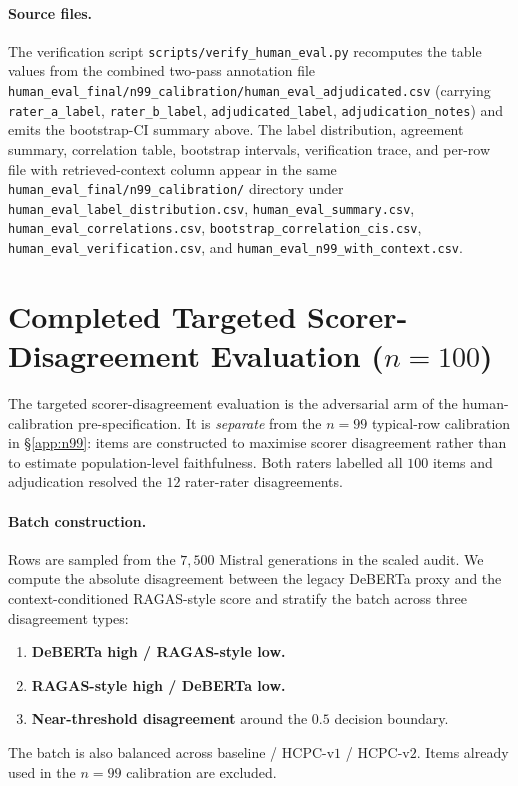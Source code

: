 \paragraph{Source files.}
\begin{sloppypar}
The verification script \texttt{scripts/verify\_human\_eval.py}
recomputes the table values from the combined two-pass annotation
file \texttt{human\_eval\_final/n99\_calibration/human\_eval\_adjudicated.csv}
(carrying \texttt{rater\_a\_label}, \texttt{rater\_b\_label},
\texttt{adjudicated\_label}, \texttt{adjudication\_notes}) and emits
the bootstrap-CI summary above. The label distribution, agreement
summary, correlation table, bootstrap intervals, verification trace,
and per-row file with retrieved-context column appear in the same
\texttt{human\_eval\_final/n99\_calibration/} directory under
\texttt{human\_eval\_label\_distribution.csv},
\texttt{human\_eval\_summary.csv},
\texttt{human\_eval\_correlations.csv},
\texttt{bootstrap\_correlation\_cis.csv},
\texttt{human\_eval\_verification.csv}, and
\texttt{human\_eval\_n99\_with\_context.csv}.
\end{sloppypar}

\section{Completed Targeted Scorer-Disagreement Evaluation \texorpdfstring{($n=100$)}{(n=100)}}
\label{app:n100}

The targeted scorer-disagreement evaluation is the adversarial arm of
the human-calibration pre-specification. It is \emph{separate} from the
$n=99$ typical-row calibration in \S\ref{app:n99}: items
are constructed to maximise scorer disagreement rather than to
estimate population-level faithfulness. Both raters labelled all $100$
items and adjudication resolved the $12$ rater-rater disagreements.

\paragraph{Batch construction.}
Rows are sampled from the $7{,}500$ Mistral generations in the scaled
audit. We compute the absolute disagreement between the legacy DeBERTa
proxy and the context-conditioned RAGAS-style score and stratify the
batch across three disagreement types:
\begin{enumerate}
    \item \textbf{DeBERTa high / RAGAS-style low.}
    \item \textbf{RAGAS-style high / DeBERTa low.}
    \item \textbf{Near-threshold disagreement} around the $0.5$
        decision boundary.
\end{enumerate}
The batch is also balanced across baseline / HCPC-v$1$ / HCPC-v$2$.
Items already used in the $n=99$ calibration are excluded.

